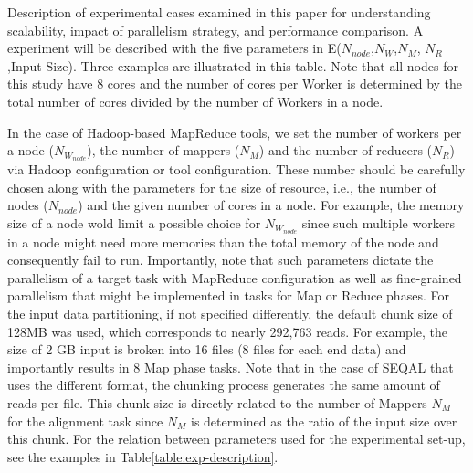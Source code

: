 \documentclass{sig-alternate}
\begin{document}
{\begin{table}
 \caption{Description of experimental cases examined in this paper for understanding scalability, impact of parallelism strategy, and performance comparison.  A experiment will be described with the five parameters in E($N_{node}$,$N_W$,$N_M$, $N_R$,Input Size).  Three examples are illustrated in this table.  Note that all nodes for this study have 8 cores and the number of cores per Worker is determined by the total number of cores divided by the number of Workers in a node.}
    \label{table:exp-description} 
\end{table}

In the case of Hadoop-based MapReduce tools, we set the number of workers per a node ($N_{W_{node}}$), the number of mappers ($N_M$) and the number of reducers ($N_R$) via Hadoop configuration or tool configuration.  These number should be carefully chosen along with the parameters for the size of resource, i.e., the number of nodes ($N_{node}$) and the given number of cores in a node.  For example, the memory size of a node wold limit a possible choice for $N_{W_{node}}$ since such multiple workers in a node might need more memories than the total memory of the node and consequently fail to run.  Importantly, note that such parameters dictate the parallelism of a target task with MapReduce configuration as well as fine-grained parallelism that might be implemented in tasks for Map or Reduce phases.  For the input data partitioning, if not specified differently, the default chunk size of 128MB was used, which corresponds to nearly 292,763 reads.  For example, the size of 2 GB input is broken into 16 files (8 files for each end data) and importantly results in 8 Map phase tasks.  Note that in the case of SEQAL that uses the different format, the chunking process generates the same amount of reads per file.  This chunk size is directly related to the number of Mappers $N_M$ for the alignment task since  $N_M$ is determined as the ratio of the input size over this chunk.   For the relation between parameters used for the experimental set-up, see the examples in Table\ref{table:exp-description}. 
%

}
\end{document}
